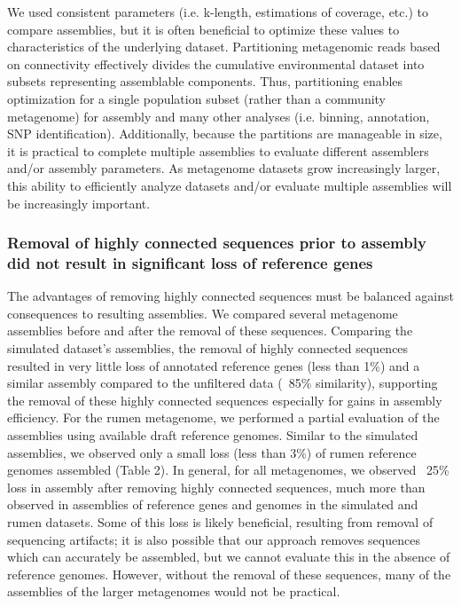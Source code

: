 \documentclass[10pt]{article}
\begin{document}
We used consistent parameters (i.e. k-length, estimations of coverage,
etc.) to compare assemblies, but it is often beneficial to optimize
these values to characteristics of the underlying dataset.
Partitioning metagenomic reads based on connectivity effectively
divides the cumulative environmental dataset into subsets representing
assemblable components.
Thus, partitioning enables
optimization for a single population subset (rather than a community
metagenome) for assembly and many other analyses (i.e. binning,
annotation, SNP identification).  Additionally, because the partitions
are manageable in size, it is practical to complete multiple
assemblies to evaluate different assemblers and/or assembly
parameters.  As metagenome datasets grow increasingly larger, this
ability to efficiently analyze datasets and/or evaluate multiple
assemblies will be increasingly important.

\subsubsection*{Removal of highly connected sequences prior to assembly did not result in significant loss of reference genes}
The advantages of removing highly connected sequences must be balanced
against consequences to resulting assemblies.  We compared several
metagenome assemblies before and after the removal of these sequences.
Comparing the simulated dataset's assemblies, the removal of highly
connected sequences resulted in very little loss of annotated
reference genes (less than 1\%) and a similar assembly compared to the
unfiltered data (~85\% similarity), supporting the removal of these
highly connected sequences especially for gains in assembly
efficiency.  For the rumen metagenome, we performed a partial
evaluation of the assemblies using available draft reference genomes.
Similar to the simulated assemblies, we observed only a small loss
(less than 3\%) of rumen reference genomes assembled (Table 2).  In
general, for all metagenomes, we observed ~25\% loss in assembly after
removing highly connected sequences, much more than observed in
assemblies of reference genes and genomes in the simulated and rumen
datasets.  Some of this loss is likely beneficial, resulting from
removal of sequencing artifacts; it is also possible that our approach
removes sequences which can accurately be assembled, but we cannot
evaluate this in the absence of reference genomes.
However, without the
removal of these sequences, many of the assemblies of the larger
metagenomes would not be practical.
\end{document}
